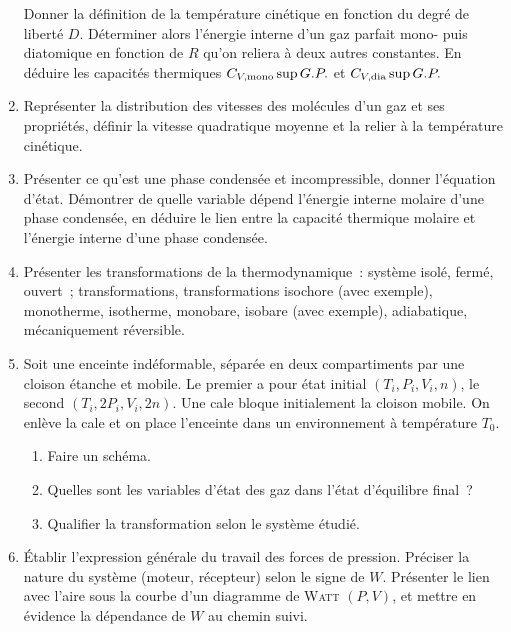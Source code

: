 \documentclass[a4paper, 10pt, final, garamond]{book}
\begin{document}
\begin{enumerate}[label=\sqenumi]
	\litem{23pt}{\strr}%
	Donner la définition de la température cinétique en
	fonction du degré de liberté $D$. Déterminer alors l'énergie interne d'un
	gaz parfait mono- puis diatomique en fonction de $R$ qu'on reliera à deux
	autres constantes. En déduire les capacités thermiques $C_{V,\rm
				mono}\sup{G.P.}$ et $C_{V,\rm dia}\sup{G.P.}$

	\item Représenter la distribution des vitesses des molécules d'un gaz et ses
	      propriétés, définir la vitesse quadratique moyenne et la relier à la
	      température cinétique.

	\item Présenter ce qu'est une phase condensée et incompressible, donner
	      l'équation d'état. Démontrer de quelle variable dépend l'énergie interne
	      molaire d'une phase condensée, en déduire le lien entre la capacité
	      thermique molaire et l'énergie interne d'une phase condensée.

	\item Présenter les transformations de la thermodynamique~: système isolé,
	      fermé, ouvert~; transformations, transformations isochore (avec exemple),
	      monotherme, isotherme, monobare, isobare (avec exemple), adiabatique,
	      mécaniquement réversible.

	\item Soit une enceinte indéformable, séparée en deux compartiments par une
	      cloison étanche et mobile. Le premier a pour état initial $(T_i,P_i,V_i,n)$,
	      le second $(T_i,2P_i,V_i,2n)$. Une cale bloque initialement la cloison
	      mobile. On enlève la cale et on place l'enceinte dans un environnement à
	      température $T_0$.
	      \begin{enumerate}[label=\alph*)]
		      \item Faire un schéma.
		      \item Quelles sont les variables d'état des gaz dans l'état
		            d'équilibre final~?
		      \item Qualifier la transformation selon le système étudié.
	      \end{enumerate}

	\item Établir l'expression générale du travail des forces de pression.
	      Préciser la nature du système (moteur, récepteur) selon le signe de $W$.
	      Présenter le lien avec l'aire sous la courbe d'un diagramme de
	      \textsc{Watt} $(P,V)$, et mettre en évidence la dépendance de $W$ au
	      chemin suivi.


\end{enumerate}
\end{document}
